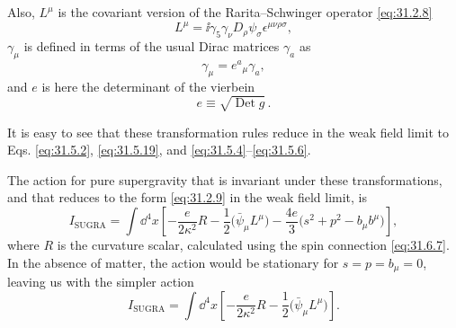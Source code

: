 Also, \(L^\mu\) is the covariant version of the Rarita--Schwinger
operator \eqref{eq:31.2.8}
\begin{equation}
  L^\mu=\ii\gamma_5\gamma_\nu D_\rho\psi_\sigma
    \epsilon^{\mu\nu\rho\sigma},
  \tag{31.6.8}\label{eq:31.6.8}
\end{equation}
\(\gamma_\mu\) is defined in terms of the usual Dirac matrices
\(\gamma_a\) as
\begin{equation}
  \gamma_\mu=e^a{}_\mu\gamma_a,
  \tag{31.6.9}\label{eq:31.6.9}
\end{equation}
and \(e\) is here the determinant of the vierbein
\begin{equation}
  e\equiv\sqrt{\operatorname{Det}g}\,.
  \tag{31.6.10}\label{eq:31.6.10}
\end{equation}

It is easy to see that these transformation rules reduce in the weak
field limit to Eqs. \eqref{eq:31.5.2}, \eqref{eq:31.5.19}, and
\eqref{eq:31.5.4}--\eqref{eq:31.5.6}.

The action for pure supergravity that is invariant under these
transformations, and that reduces to the form \eqref{eq:31.2.9} in the
weak field limit, is
\begin{equation}
  I_{\mathrm{SUGRA}}
  =\int \dd^4x\left[
    -\frac{e}{2\kappa^2}R
    -\frac{1}{2}\bigl(\bar\psi_\mu L^\mu\bigr)
    -\frac{4e}{3}\bigl(s^2+p^2-b_\mu b^\mu\bigr)
  \right],
  \tag{31.6.11}\label{eq:31.6.11}
\end{equation}
where \(R\) is the curvature scalar, calculated using the spin
connection \eqref{eq:31.6.7}. In the absence of matter, the action would
be stationary for \(s=p=b_\mu=0\), leaving us with the simpler action
\[
  I_{\mathrm{SUGRA}}
  =\int \dd^4x\left[
    -\frac{e}{2\kappa^2}R
    -\frac{1}{2}\bigl(\bar\psi_\mu L^\mu\bigr)
  \right].
\]

